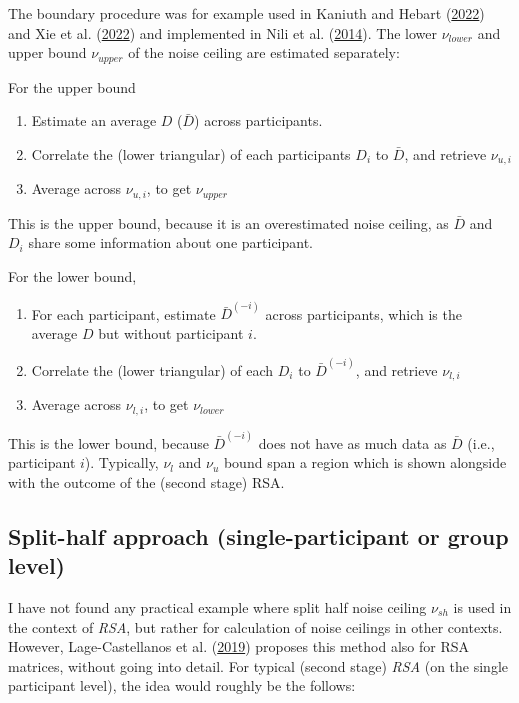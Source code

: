 \documentclass[
  letterpaper,
  DIV=11,
  numbers=noendperiod]{scrartcl}
\providecommand{\tightlist}{%
  \setlength{\itemsep}{0pt}\setlength{\parskip}{0pt}}\usepackage{longtable,booktabs,array}
\begin{document}
The boundary procedure was for example used in Kaniuth and Hebart
(\protect\hyperlink{ref-kaniuth2022}{2022}) and Xie et al.
(\protect\hyperlink{ref-xie2022}{2022}) and implemented in Nili et al.
(\protect\hyperlink{ref-nili2014}{2014}). The lower \(\nu_{lower}\) and
upper bound \(\nu_{upper}\) of the noise ceiling are estimated
separately:

For the upper bound

\begin{enumerate}
\def\labelenumi{\arabic{enumi}.}
\tightlist
\item
  Estimate an average \(D\) (\(\bar{D}\)) across participants.
\item
  Correlate the (lower triangular) of each participants \(D_i\) to
  \(\bar{D}\), and retrieve \(\nu_{u,i}\)
\item
  Average across \(\nu_{u,i}\), to get \(\nu_{upper}\)
\end{enumerate}

This is the upper bound, because it is an overestimated noise ceiling,
as \(\bar{D}\) and \(D_i\) share some information about one participant.

For the lower bound,

\begin{enumerate}
\def\labelenumi{\arabic{enumi}.}
\tightlist
\item
  For each participant, estimate \(\bar{D}^{(-i)}\) across participants,
  which is the average \(D\) but without participant \(i\).
\item
  Correlate the (lower triangular) of each \(D_i\) to
  \(\bar{D}^{(-i)}\), and retrieve \(\nu_{l,i}\)
\item
  Average across \(\nu_{l,i}\), to get \(\nu_{lower}\)
\end{enumerate}

This is the lower bound, because \(\bar{D}^{(-i)}\) does not have as
much data as \(\bar{D}\) (i.e., participant \(i\)). Typically, \(\nu_l\)
and \(\nu_u\) bound span a region which is shown alongside with the
outcome of the (second stage) RSA.

\hypertarget{sec-NCsh-RSA}{%
\subsection{Split-half approach (single-participant or group
level)}\label{sec-NCsh-RSA}}

I have not found any practical example where split half noise ceiling
\(\nu_{sh}\) is used in the context of \emph{RSA}, but rather for
calculation of noise ceilings in other contexts. However,
Lage-Castellanos et al.
(\protect\hyperlink{ref-lage-castellanos2019}{2019}) proposes this
method also for RSA matrices, without going into detail. For typical
(second stage) \emph{RSA} (on the single participant level), the idea
would roughly be the follows:
\end{document}
